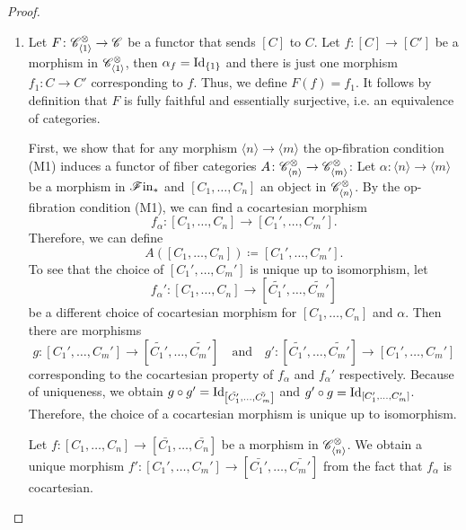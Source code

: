 \begin{proof}
\begin{enumerate}[(M1)]
            \item Let $F \colon \mathscr{C}^{\otimes}_{\langle 1 \rangle} \to \mathscr{C}$ be a
            functor that sends $[C]$ to $C$. Let $f \colon [C] \to [C']$ be a
            morphism in $\mathscr{C}^{\otimes}_{\langle 1 \rangle}$, then $\alpha_f =
            \operatorname{Id}_{\{1\}}$ and there is just one morphism $f_1 \colon C \to C'$
            corresponding to $f$. Thus, we define $F(f) = f_1$. It follows by
            definition that $F$ is fully faithful and essentially surjective,
            i.e. an equivalence of categories.

            First, we show that for any morphism $\langle n \rangle \to
            \langle m \rangle$ the op-fibration condition (M1) induces a functor
            of fiber categories $A \colon \mathscr{C}^{\otimes}_{\langle n \rangle} \to
            \mathscr{C}^{\otimes}_{\langle m \rangle}$: Let $\alpha \colon \langle n \rangle
            \to \langle m \rangle$ be a morphism in $\mathscr{F} \text{in}_{\ast}$ and $[C_1, \dots,
            C_n]$ an object in $\mathscr{C}^{\otimes}_{\langle n \rangle}$. By the
            op-fibration condition (M1), we can find a cocartesian morphism 
            $$f_{\alpha} \colon [C_1, \dots, C_n] \to [C_1', \dots, C_m'].$$
            Therefore, we can define 
            \[
            A([C_1, \dots, C_n]) \coloneqq [C_1', \dots, C_m'].
            \]
            To see that the choice of $[C_1', \dots, C_m']$ is unique up to
            isomorphism, let 
            $$f_{\alpha}' \colon \left[C_1, \dots, C_n\right] \to
            \left[\tilde{C_1'}, \dots, \tilde{C_m'}\right]$$ be a different
            choice of cocartesian morphism for $\left[C_1, \dots, C_n\right]$
            and $\alpha$. Then there are morphisms 
            \[
            g \colon \left[C_1', \dots, C_m'\right] \to \left[\tilde{C_1'}, \dots, \tilde{C_m'}\right] \quad \text{and} \quad g' \colon \left[\tilde{C_1'}, \dots, \tilde{C_m'}\right] \to \left[C_1', \dots, C_m'\right]
            \]
            corresponding to the cocartesian property of $f_{\alpha}$ and
            $f_{\alpha}'$ respectively. Because of uniqueness, we obtain $g
            \circ g'  = \operatorname{Id}_{\left[\tilde{C_1'}, \dots, \tilde{C_m'}\right]}$
            and $g' \circ g = \operatorname{Id}_{[C_1', \dots, C_m']}$. Therefore, the choice
            of a cocartesian morphism is unique up to isomorphism.
            
            Let $f \colon [C_1, \dots, C_n] \to \left[\bar{C_1}, \dots,
            \bar{C_n}\right]$ be a morphism in $\mathscr{C}^{\otimes}_{\langle n \rangle}$.
            We obtain a unique morphism $f' \colon [C_1', \dots, C_m'] \to
            \left[\bar{C_1'}, \dots, \bar{C_m'}\right]$ from the fact that
            $f_{\alpha}$ is cocartesian.
            

\end{enumerate}
\end{proof}
